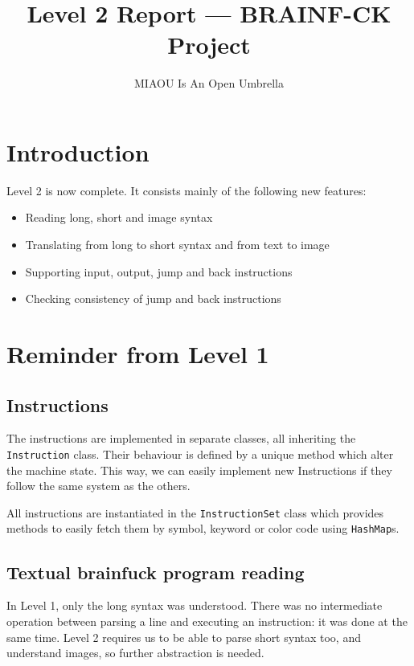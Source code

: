 \documentclass{article}
\author{MIAOU Is An Open Umbrella}
\title{\vspace{-1cm}Level 2 Report --- BRAINF-CK Project}
\begin{document}
\maketitle



\section{Introduction}

Level 2 is now complete. It consists mainly of the following new features:
\begin{itemize}
  \item Reading long, short and image syntax 
  \item Translating from long to short syntax and from text to image
  \item Supporting input, output, jump and back instructions
  \item Checking consistency of jump and back instructions
\end{itemize}

\section{Reminder from Level 1}

\subsection{Instructions}

The instructions are implemented in separate classes, all inheriting the \texttt{Instruction} class. Their behaviour is defined by a unique method which alter the machine state. This way, we can easily implement new Instructions if they follow the same system as the others.

All instructions are instantiated in the \texttt{InstructionSet} class which provides methods to easily fetch them by symbol, keyword or color code using \texttt{HashMap}s.

\subsection{Textual brainfuck program reading}

In Level 1, only the long syntax was understood. There was no intermediate operation between parsing a line and executing an instruction: it was done at the same time. Level 2 requires us to be able to parse short syntax too, and understand images, so further abstraction is needed.
\end{document}
